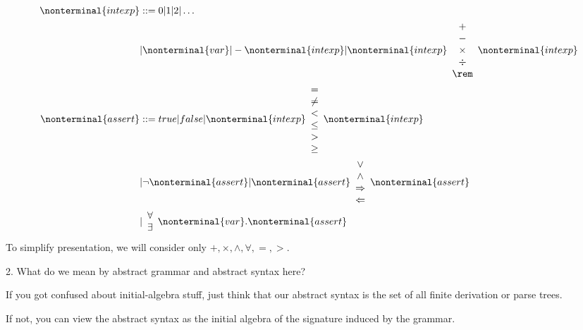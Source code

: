 \documentclass{report}[12pt]
\begin{document}
\begin{align*}
    \nonterminal{intexp} &::= 0 | 1 | 2 | \ldots \\
    &| \nonterminal{var} | -\nonterminal{intexp} | \nonterminal{intexp} \begin{array}{c} + \\ - \\ \times \\ \div \\ \rem \end{array} \nonterminal{intexp} \\
    \nonterminal{assert} &::= true | false | \nonterminal{intexp} \begin{array}{c} = \\ \neq \\ < \\ \le \\ > \\ \ge \end{array} \nonterminal{intexp} \\
    &| \neg \nonterminal{assert} | \nonterminal{assert} \begin{array}{c} \vee \\ \wedge \\ \Rightarrow \\ \Leftarrow \end{array} \nonterminal{assert} \\
    &| \begin{array}{c} \forall \\ \exists \end{array} \nonterminal{var}. \nonterminal{assert}
\end{align*}
To simplify presentation, we will consider only $+, \times, \wedge, \forall, =, >$.

2. What do we mean by abstract grammar and abstract syntax here?

If you got confused about initial-algebra stuff, just think that our abstract syntax is the set of all finite derivation or parse trees.

If not, you can view the abstract syntax as the initial algebra of the signature induced by the grammar.
\end{document}
